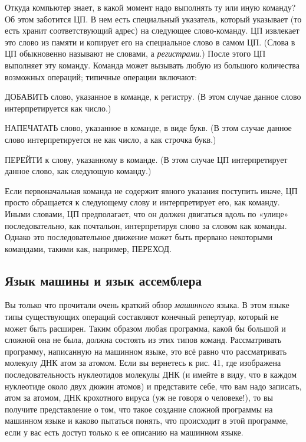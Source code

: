 \documentclass[../main.tex]{subfiles}
\begin{document}
Откуда компьютер знает, в какой момент надо выполнять ту или иную команду? Об этом заботится ЦП\@. В нем есть специальный указатель, который указывает (то есть хранит соответствующий адрес) на следующее слово-команду. ЦП извлекает это слово из памяти и копирует его на специальное слово в самом ЦП\@. (Слова в ЦП обыкновенно называют не словами, а \emph{регистрами}.) После этого ЦП выполняет эту команду. Команда может вызывать любую из большого количества возможных операций; типичные операции включают:

ДОБАВИТЬ слово, указанное в команде, к регистру. (В этом случае данное слово интерпретируется как число.)

НАПЕЧАТАТЬ слово, указанное в команде, в виде букв. (В этом случае данное слово интерпретируется не как число, а как строчка букв.)

ПЕРЕЙТИ к слову, указанному в команде. (В этом случае ЦП интерпретирует данное слово, как следующую команду.)

Если первоначальная команда не содержит явного указания поступить иначе, ЦП просто обращается к следующему слову и интерпретирует его, как команду. Иными словами, ЦП предполагает, что он должен двигаться вдоль по «улице» последовательно, как почтальон, интерпретируя слово за словом как команды. Однако это последовательное движение может быть прервано некоторыми командами, такими как, например, ПЕРЕХОД.


\subsection{Язык машины и язык ассемблера}

Вы только что прочитали очень краткий обзор \emph{машинного} языка. В этом языке типы существующих операций составляют конечный репертуар, который не может быть расширен. Таким образом любая программа, какой бы большой и сложной она не была, должна состоять из этих типов команд. Рассматривать программу, написанную на машинном языке, это всё равно что рассматривать молекулу ДНК атом за атомом. Если вы вернетесь к рис. 41, где изображена последовательность нуклеотидов молекулы ДНК (и имейте в виду, что в каждом нуклеотиде около двух дюжин атомов) и представите себе, что вам надо записать, атом за атомом, ДНК крохотного вируса (уж не говоря о человеке!), то вы получите представление о том, что такое создание сложной программы на машинном языке и каково пытаться понять, что происходит в этой программе, если у вас есть доступ только к ее описанию на машинном языке.
\end{document}
